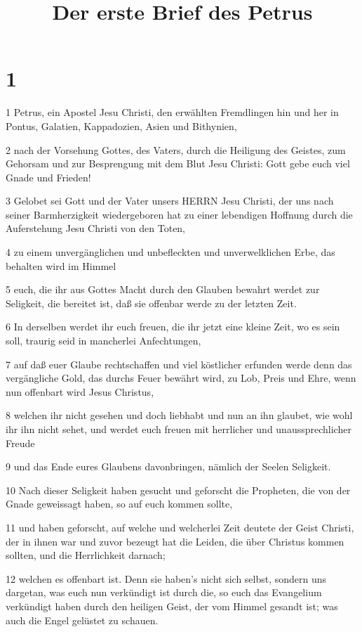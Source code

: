 

\title{Der erste Brief des Petrus}


\chapter{1}

\par 1 Petrus, ein Apostel Jesu Christi, den erwählten Fremdlingen hin und her in Pontus, Galatien, Kappadozien, Asien und Bithynien,
\par 2 nach der Vorsehung Gottes, des Vaters, durch die Heiligung des Geistes, zum Gehorsam und zur Besprengung mit dem Blut Jesu Christi: Gott gebe euch viel Gnade und Frieden!
\par 3 Gelobet sei Gott und der Vater unsers HERRN Jesu Christi, der uns nach seiner Barmherzigkeit wiedergeboren hat zu einer lebendigen Hoffnung durch die Auferstehung Jesu Christi von den Toten,
\par 4 zu einem unvergänglichen und unbefleckten und unverwelklichen Erbe, das behalten wird im Himmel
\par 5 euch, die ihr aus Gottes Macht durch den Glauben bewahrt werdet zur Seligkeit, die bereitet ist, daß sie offenbar werde zu der letzten Zeit.
\par 6 In derselben werdet ihr euch freuen, die ihr jetzt eine kleine Zeit, wo es sein soll, traurig seid in mancherlei Anfechtungen,
\par 7 auf daß euer Glaube rechtschaffen und viel köstlicher erfunden werde denn das vergängliche Gold, das durchs Feuer bewährt wird, zu Lob, Preis und Ehre, wenn nun offenbart wird Jesus Christus,
\par 8 welchen ihr nicht gesehen und doch liebhabt und nun an ihn glaubet, wie wohl ihr ihn nicht sehet, und werdet euch freuen mit herrlicher und unaussprechlicher Freude
\par 9 und das Ende eures Glaubens davonbringen, nämlich der Seelen Seligkeit.
\par 10 Nach dieser Seligkeit haben gesucht und geforscht die Propheten, die von der Gnade geweissagt haben, so auf euch kommen sollte,
\par 11 und haben geforscht, auf welche und welcherlei Zeit deutete der Geist Christi, der in ihnen war und zuvor bezeugt hat die Leiden, die über Christus kommen sollten, und die Herrlichkeit darnach;
\par 12 welchen es offenbart ist. Denn sie haben's nicht sich selbst, sondern uns dargetan, was euch nun verkündigt ist durch die, so euch das Evangelium verkündigt haben durch den heiligen Geist, der vom Himmel gesandt ist; was auch die Engel gelüstet zu schauen.
